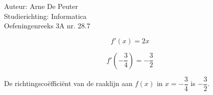 \documentclass[a4paper]{article}
\begin{document}
\noindent \large Auteur: Arne De Peuter\\
\noindent \large Studierichting: Informatica\\
\noindent \large Oefeningenreeks 3A nr. 28.7\\

\medskip

\normalsize

$$
f'(x) = 2x
$$

\medskip

$$
f'\left(-\dfrac{3}{4}\right) = -\dfrac{3}{2}
$$


De richtingscoëfficiënt van de raaklijn aan $f(x)$ in $x = -\dfrac{3}{4}$ is $-\dfrac{3}{2}$.



\end{document}
